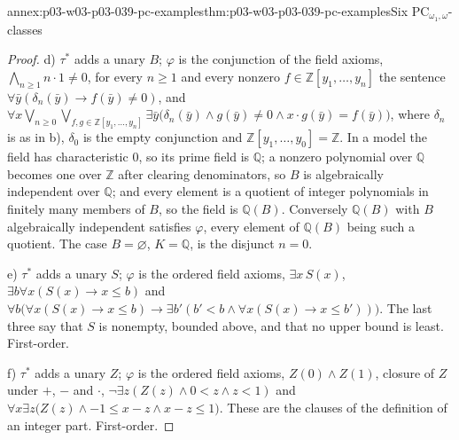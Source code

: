 \begin{annexitem}{annex:p03-w03-p03-039-pc-examples}{thm:p03-w03-p03-039-pc-examples}{Six \(\mathrm{PC}_{\omega_1,\omega}\)-classes}
\begin{proof}
d) \(\tau^*\) adds a unary \(B\); \(\varphi\) is the conjunction of the field
axioms, \(\bigwedge_{n\ge1}n\cdot1\ne0\), for every \(n\ge1\) and every
nonzero \(f\in\mathbb Z[y_1,\dots,y_n]\) the sentence
\(\forall\bar y(\delta_n(\bar y)\to f(\bar y)\ne0)\), and
\(\forall x\bigvee_{n\ge0}\bigvee_{f,g\in\mathbb Z[y_1,\dots,y_n]}\exists\bar y\bigl(\delta_n(\bar y)\wedge g(\bar y)\ne0\wedge x\cdot g(\bar y)=f(\bar y)\bigr)\),
where \(\delta_n\) is as in b), \(\delta_0\) is the empty conjunction and
\(\mathbb Z[y_1,\dots,y_0]=\mathbb Z\). In a model the field has characteristic
\(0\), so its prime field is \(\mathbb Q\); a nonzero polynomial over
\(\mathbb Q\) becomes one over \(\mathbb Z\) after clearing denominators, so
\(B\) is algebraically independent over \(\mathbb Q\); and every element is a
quotient of integer polynomials in finitely many members of \(B\), so the
field is \(\mathbb Q(B)\). Conversely \(\mathbb Q(B)\) with \(B\)
algebraically independent satisfies \(\varphi\), every element of
\(\mathbb Q(B)\) being such a quotient. The case \(B=\varnothing\), \(K=\mathbb Q\), is the disjunct \(n=0\).

e) \(\tau^*\) adds a unary \(S\); \(\varphi\) is the ordered field axioms,
\(\exists x\,S(x)\), \(\exists b\forall x(S(x)\to x\le b)\) and
\(\forall b\bigl(\forall x(S(x)\to x\le b)\to\exists b'(b'<b\wedge\forall x(S(x)\to x\le b'))\bigr)\).
The last three say that \(S\) is nonempty, bounded above, and that no upper
bound is least. First-order.

f) \(\tau^*\) adds a unary \(Z\); \(\varphi\) is the ordered field axioms,
\(Z(0)\wedge Z(1)\), closure of \(Z\) under \(+\), \(-\) and \(\cdot\),
\(\neg\exists z(Z(z)\wedge0<z\wedge z<1)\) and
\(\forall x\exists z\bigl(Z(z)\wedge-1\le x-z\wedge x-z\le1\bigr)\). These
are the clauses of the definition of an integer part. First-order.
\end{proof}
\end{annexitem}

